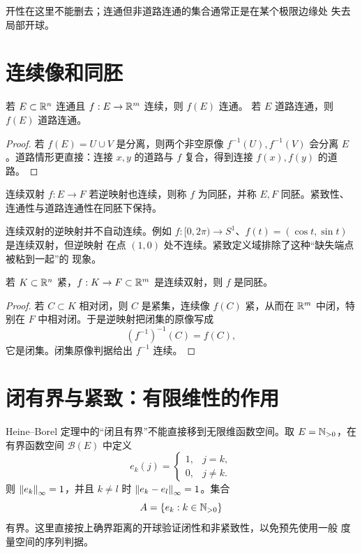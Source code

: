 开性在这里不能删去；连通但非道路连通的集合通常正是在某个极限边缘处
失去局部开球。

\section{连续像和同胚}

\begin{theorem}[连续像保持连通]
\label{thm:continuous-image-connected-euclidean}
若 \(E\subset\mathbb{R}^n\) 连通且 \(f:E\to\mathbb{R}^m\) 连续，则 \(f(E)\) 连通。
若 \(E\) 道路连通，则 \(f(E)\) 道路连通。
\end{theorem}

\begin{proof}
若 \(f(E)=U\cup V\) 是分离，则两个非空原像
\(f^{-1}(U),f^{-1}(V)\) 会分离 \(E\)。道路情形更直接：连接 \(x,y\)
的道路与 \(f\) 复合，得到连接 \(f(x),f(y)\) 的道路。
\end{proof}

\begin{definition}[同胚]
连续双射 \(f:E\to F\) 若逆映射也连续，则称 \(f\) 为同胚，并称 \(E,F\)
同胚。紧致性、连通性与道路连通性在同胚下保持。
\end{definition}

连续双射的逆映射并不自动连续。例如
\(f:[0,2\pi)\to S^1\)、\(f(t)=(\cos t,\sin t)\) 是连续双射，但逆映射
在点 \((1,0)\) 处不连续。紧致定义域排除了这种“缺失端点被粘到一起”的
现象。

\begin{theorem}[紧空间到欧氏空间的连续双射]
\label{thm:compact-bijection-homeomorphism-euclidean}
若 \(K\subset\mathbb{R}^n\) 紧，\(f:K\to F\subset\mathbb{R}^m\) 是连续双射，则
\(f\) 是同胚。
\end{theorem}

\begin{proof}
若 \(C\subset K\) 相对闭，则 \(C\) 是紧集，连续像 \(f(C)\) 紧，从而在
\(\mathbb{R}^m\) 中闭，特别在 \(F\) 中相对闭。于是逆映射把闭集的原像写成
\[
 (f^{-1})^{-1}(C)=f(C),
\]
它是闭集。闭集原像判据给出 \(f^{-1}\) 连续。
\end{proof}

\section{闭有界与紧致：有限维性的作用}

Heine--Borel 定理中的“闭且有界”不能直接移到无限维函数空间。取
\(E=\mathbb{N}_{>0}\)，在有界函数空间 \(\mathcal B(E)\) 中定义
\[
 e_k(j)=
 \begin{cases}
 1,&j=k,\\
 0,&j\ne k.
 \end{cases}
\]
则 \(\left\lVert e_k\right\rVert_\infty=1\)，并且 \(k\ne l\) 时
\(\left\lVert e_k-e_l\right\rVert_\infty=1\)。集合
\[
 A=\{e_k:k\in\mathbb{N}_{>0}\}
\]
有界。这里直接按上确界距离的开球验证闭性和非紧致性，以免预先使用一般
度量空间的序列判据。

